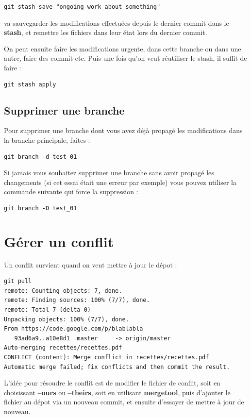 \documentclass[a4paper,twoside]{article}
\begin{document}
\begin{verbatim}
git stash save "ongoing work about something"
\end{verbatim}
va sauvegarder les modifications effectuées depuis le dernier commit dans le \textbf{stash}, et remettre les fichiers dans leur état lors du dernier commit. 

On peut ensuite faire les modifications urgente, dans cette branche ou dans une autre, faire des commit etc. Puis une fois qu'on veut réutiliser le stash, il suffit de faire : 
\begin{verbatim}
git stash apply
\end{verbatim}



\subsection{Supprimer une branche}
Pour supprimer une branche dont vous avez déjà propagé les modifications dans la branche principale, faites : 
\begin{verbatim}
git branch -d test_01
\end{verbatim}

Si jamais vous souhaitez supprimer une branche sans avoir propagé les changements (si cet essai était une erreur par exemple) vous pouvez utiliser la commande suivante qui force la suppression : 
\begin{verbatim}
git branch -D test_01
\end{verbatim}

\section{Gérer un conflit}
Un conflit survient quand on veut mettre à jour le dépot : 
\begin{verbatim}
git pull
remote: Counting objects: 7, done.
remote: Finding sources: 100% (7/7), done.
remote: Total 7 (delta 0)
Unpacking objects: 100% (7/7), done.
From https://code.google.com/p/blablabla
   93ad6a9..a10e8d1  master     -> origin/master
Auto-merging recettes/recettes.pdf
CONFLICT (content): Merge conflict in recettes/recettes.pdf
Automatic merge failed; fix conflicts and then commit the result.
\end{verbatim}

L'idée pour résoudre le conflit est de modifier le fichier de conflit, soit en choisissant \textbf{--ours} ou \textbf{--theirs}, soit en utilisant \textbf{mergetool}, puis d'ajouter le fichier au dépot via un nouveau commit, et ensuite d'essayer de mettre à jour de nouveau.
\end{document}
